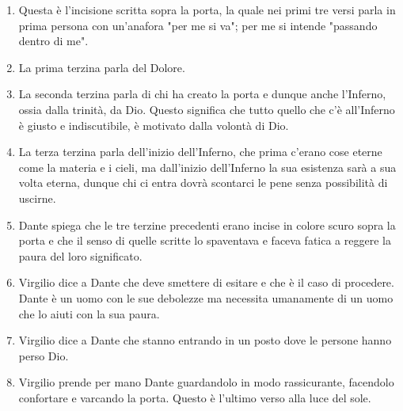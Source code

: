 \documentclass{article}
\begin{document}
\begin{enumerate}
    \item Questa è l'incisione scritta sopra la porta, la quale nei primi tre versi parla in prima persona con 
    un'anafora "per me si va"; per me si intende "passando dentro di me".
    \item La prima terzina parla del Dolore.
    \item La seconda terzina parla di chi ha creato la porta e dunque anche l'Inferno, ossia dalla trinità, da Dio.
          Questo significa che tutto quello che c'è all'Inferno è giusto e indiscutibile, è motivato dalla volontà di Dio.
    \item La terza terzina parla dell'inizio dell'Inferno, che prima c'erano cose eterne come la materia e i cieli, ma dall'inizio dell'Inferno la sua esistenza sarà a sua volta eterna, dunque chi ci entra dovrà scontarci le pene senza possibilità di uscirne.
    \item 
    Dante spiega che le tre terzine precedenti erano incise in colore scuro sopra la porta e che il senso di quelle scritte lo spaventava e faceva fatica a reggere la paura del loro significato.
    \item 
    Virgilio dice a Dante che deve smettere di esitare e che è il caso di procedere. 
    Dante è un uomo con le sue debolezze ma necessita umanamente di un uomo che lo aiuti con la sua paura.
    \item 
    Virgilio dice a Dante che stanno entrando in un posto dove le persone hanno perso Dio.
    \item 
    Virgilio prende per mano Dante guardandolo in modo rassicurante, facendolo confortare e varcando la porta. Questo è l'ultimo verso alla luce del sole.

\end{enumerate}
\end{document}

